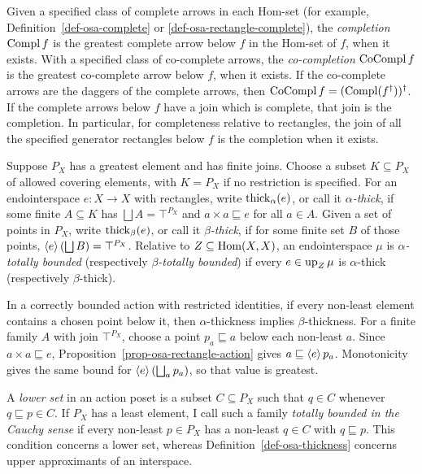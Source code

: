 \begin{defn}\label{def-osa-completion}
Given a specified class of complete arrows in each Hom-set
(for example, Definition~\ref{def-osa-complete} or
\ref{def-osa-rectangle-complete}), the \emph{completion} $\operatorname{Compl} f$ is
the greatest complete arrow below $f$ in the Hom-set of $f$, when
it exists. With a specified class of co-complete arrows, the
\emph{co-completion} $\operatorname{CoCompl} f$ is the greatest co-complete arrow
below $f$, when it exists. If the co-complete arrows are the
daggers of the complete arrows, then
$\operatorname{CoCompl} f=(\operatorname{Compl}(f^\dagger))^\dagger$. If the complete arrows below $f$ have a join which is
complete, that join is the completion. In particular, for
completeness relative to rectangles, the join of all the specified
generator rectangles below $f$ is the completion when it exists.
\end{defn}

\begin{defn}\label{def-osa-thickness}
Suppose $P_X$ has a greatest element and has finite joins.
Choose a subset $K\subseteq P_X$ of allowed covering elements,
with $K=P_X$ if no restriction is specified.
For an endointerspace $e:X\to X$ with rectangles, write
$\operatorname{thick}_\alpha(e)$, or call it \emph{$\alpha$-thick}, if some
finite $A\subseteq K$ has $\bigsqcup A=\top^{P_X}$ and
$a\times a\sqsubseteq e$ for all $a\in A$. Given a set of points
in $P_X$, write $\operatorname{thick}_\beta(e)$, or call it \emph{$\beta$-thick},
if for some finite set $B$ of those points,
$\supfun{e}(\bigsqcup B)=\top^{P_X}$.
Relative to $Z\subseteq\operatorname{Hom}(X,X)$, an endointerspace $\mu$
is \emph{$\alpha$-totally bounded} (respectively
\emph{$\beta$-totally bounded}) if every $e\in\operatorname{up}_Z\mu$ is
$\alpha$-thick (respectively $\beta$-thick).
\end{defn}

In a correctly bounded action with restricted identities, if every
non-least element contains a chosen point below it, then
$\alpha$-thickness implies $\beta$-thickness. For a finite family $A$ with join $\top^{P_X}$, choose a point $p_a\sqsubseteq a$ below each
non-least $a$. Since $a\times a\sqsubseteq e$,
Proposition~\ref{prop-osa-rectangle-action} gives
$a\sqsubseteq\left\langle e\right\rangle p_a$. Monotonicity gives the same bound for
$\supfun{e}(\bigsqcup_a p_a)$, so that value is greatest.

A \emph{lower set} in an action poset is a subset $C\subseteq P_X$
such that $q\in C$ whenever $q\sqsubseteq p\in C$.
If $P_X$ has a least element, I call such a family \emph{totally
bounded in the Cauchy sense} if every non-least $p\in P_X$ has a
non-least $q\in C$ with $q\sqsubseteq p$. This condition concerns
a lower set, whereas Definition~\ref{def-osa-thickness} concerns
upper approximants of an interspace.

